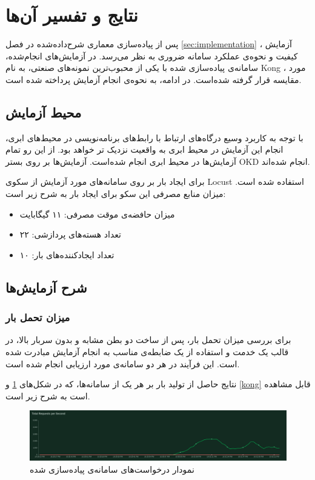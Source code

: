 \section{نتایج و تفسیر آن‌ها}\label{sec:results}
پس از پیاده‌سازی معماری شرح‌داده‌شده در فصل
\ref{sec:implementation}
، آزمایش کیفیت و نحوه‌ی عملکرد سامانه ضروری به نظر می‌رسد. در آزمایش‌های انجام‌شده، سامانه‌ی پیاده‌سازی شده با یکی از محبوب‌ترین نمونه‌های صنعتی، به نام Kong ، مورد مقایسه قرار گرفته شده‌است. در ادامه، به نحوه‌ی انجام آزمایش پرداخته شده است.


\subsection{محیط آزمایش}\label{subsec:results_env}
با توجه به کاربرد وسیع درگاه‌های ارتباط با رابط‌های برنامه‌نویسی در محیط‌های ابری، انجام این آزمایش در محیط ابری به واقعیت نزدیک تر خواهد بود. از این رو تمام آزمایش‌ها در محیط ابری انجام شده‌است. آزمایش‌ها بر روی بستر OKD انجام شده‌اند.

برای ایجاد بار بر روی سامانه‌های مورد آزمایش از سکوی Locust استفاده شده است. میزان منابع مصرفی این سکو برای ایجاد بار به شرح زیر است:

\begin{itemize}
    \item میزان حافضه‌ی موقت مصرفی: ۱۱ گیگابایت
    \item تعداد هسته‌های پردازشی: ۲۲
    \item تعداد ایجاد‌کننده‌های بار: ۱۰
\end{itemize}

\subsection{شرح آزمایش‌ها}\label{subsec:results_tests}


\subsubsection{میزان تحمل بار}
برای بررسی میزان تحمل بار، پس از ساخت دو بطن مشابه و بدون سربار بالا، در قالب یک خدمت و استفاده از یک ضابطه‌ی مناسب به انجام آزمایش مبادرت شده است. این فرآیند در هر دو سامانه‌ی مورد ارزیابی انجام شده است.

نتایج حاصل از تولید‌ بار بر هر یک از سامانه‌ها، که در شکل‌های
\ref{highway}
و
\ref{kong}
قابل مشاهده است به شرح زیر است.

\begin{figure}[H]
    \centering
    \caption{نمودار درخواست‌های سامانه‌ی پیاده‌سازی شده}
    \label{highway}
    \includegraphics[scale=0.25]{images/HighwayStats.png}
\end{figure}

